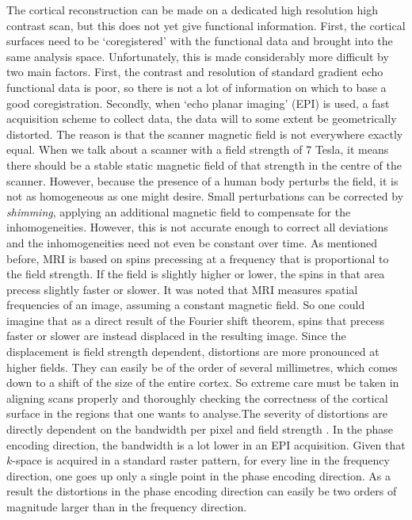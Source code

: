 The cortical reconstruction can be made on a dedicated high resolution high contrast scan, but this does not yet give functional information. First, the cortical surfaces need to be `coregistered' with the functional data and brought into the same analysis space. Unfortunately, this is made considerably more difficult by two main factors. First, the contrast and resolution of standard gradient echo functional data is poor, so there is not a lot of information on which to base a good coregistration. Secondly, when `echo planar imaging' (EPI) is used, a fast acquisition scheme to collect data, the data will to some extent be geometrically distorted. The reason is that the scanner magnetic field is not everywhere exactly equal. When we talk about a scanner with a field strength of 7 Tesla, it means there should be a stable static magnetic field of that strength in the centre of the scanner. However, because the presence of a human body perturbs the field, it is not as homogeneous as one might desire. Small perturbations can be corrected by \emph{shimming}, applying an additional magnetic field to compensate for the inhomogeneities. However, this is not accurate enough to correct all deviations and the inhomogeneities need not even be constant over time. As mentioned before, MRI is based on spins precessing at a frequency that is proportional to the field strength. If the field is slightly higher or lower, the spins in that area precess slightly faster or slower. It was noted that MRI measures spatial frequencies of an image, assuming a constant magnetic field. So one could imagine that as a direct result of the Fourier shift theorem, spins that precess faster or slower are instead displaced in the resulting image. Since the displacement is field strength dependent, distortions are more pronounced at higher fields. They can easily be of the order of several millimetres, which comes down to a shift of the size of the entire cortex. So extreme care must be taken in aligning scans properly and thoroughly checking the correctness of the cortical surface in the regions that one wants to analyse.The severity of distortions are directly dependent on the bandwidth per pixel and field strength \cite{Jezzard1995,Schmitt1998}. In the phase encoding direction, the bandwidth is a lot lower in an EPI acquisition. Given that $k$-space is acquired in a standard raster pattern, for every line in the frequency direction, one goes up only a single point in the phase encoding direction. As a result the distortions in the phase encoding direction can easily be two orders of magnitude larger than in the frequency direction.

